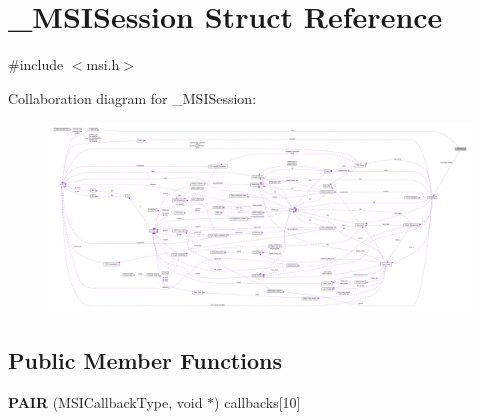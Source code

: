 \hypertarget{struct___m_s_i_session}{\section{\+\_\+\+M\+S\+I\+Session Struct Reference}
\label{struct___m_s_i_session}
}


{\ttfamily \#include $<$msi.\+h$>$}



Collaboration diagram for \+\_\+\+M\+S\+I\+Session\+:
\nopagebreak
\begin{figure}[H]
\begin{center}
\leavevmode
\includegraphics[width=350pt]{struct___m_s_i_session__coll__graph}
\end{center}
\end{figure}
\subsection*{Public Member Functions}
\begin{DoxyCompactItemize}
\item 
\hypertarget{struct___m_s_i_session_ad2cc3cf843c4b08a69f831cdad2eea1a}{{\bfseries P\+A\+I\+R} (M\+S\+I\+Callback\+Type, void $\ast$) callbacks\mbox{[}10\mbox{]}}\label{struct___m_s_i_session_ad2cc3cf843c4b08a69f831cdad2eea1a}

\end{DoxyCompactItemize}
